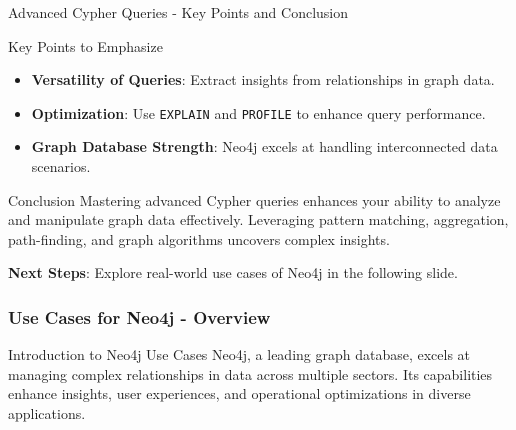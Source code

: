 \documentclass[aspectratio=169]{beamer}
\begin{document}
\begin{frame}[fragile]{Advanced Cypher Queries - Key Points and Conclusion}
  \begin{block}{Key Points to Emphasize}
    \begin{itemize}
      \item \textbf{Versatility of Queries}: Extract insights from relationships in graph data.
      \item \textbf{Optimization}: Use \texttt{EXPLAIN} and \texttt{PROFILE} to enhance query performance.
      \item \textbf{Graph Database Strength}: Neo4j excels at handling interconnected data scenarios.
    \end{itemize}
  \end{block}
  
  \begin{block}{Conclusion}
    Mastering advanced Cypher queries enhances your ability to analyze and manipulate graph data effectively. 
    Leveraging pattern matching, aggregation, path-finding, and graph algorithms uncovers complex insights.
  \end{block}
  
  \textbf{Next Steps}: Explore real-world use cases of Neo4j in the following slide.
\end{frame}

\begin{frame}[fragile]
    \frametitle{Use Cases for Neo4j - Overview}
    \begin{block}{Introduction to Neo4j Use Cases}
        Neo4j, a leading graph database, excels at managing complex relationships in data across multiple sectors.
        Its capabilities enhance insights, user experiences, and operational optimizations in diverse applications.
    \end{block}
\end{frame}
\end{document}
